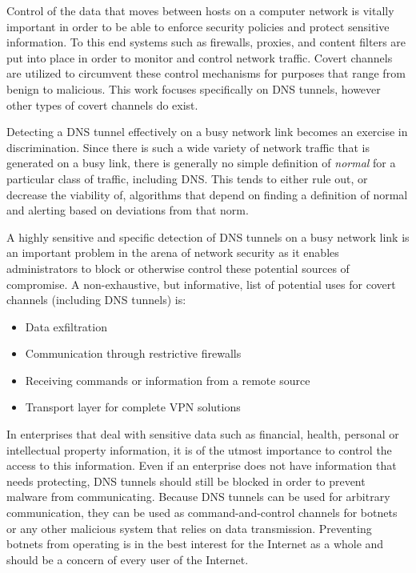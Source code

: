 \documentclass[12pt]{report}
\theoremstyle{remark}
\theoremstyle{definition}
\theoremstyle{definition}
\theoremstyle{definition}
\begin{document}
Control of the data that moves between hosts on a computer network is vitally
important in order to be able to enforce security policies and protect sensitive
information. To this end systems such as firewalls, proxies, and content filters
are put into place in order to monitor and control network traffic. Covert
channels are utilized to circumvent these control mechanisms for purposes that
range from benign to malicious. This work focuses specifically on DNS tunnels,
however other types of covert channels do exist.

Detecting a DNS tunnel effectively on a busy network link becomes an exercise in
discrimination. Since there is such a wide variety of network traffic that is
generated on a busy link, there is generally no simple definition of
\emph{normal} for a particular class of traffic, including DNS. This tends to
either rule out, or decrease the viability of, algorithms that depend on finding
a definition of normal and alerting based on deviations from that norm.

A highly sensitive and specific detection of DNS tunnels on a busy network link
is an important problem in the arena of network security as it enables
administrators to block or otherwise control these potential sources of
compromise. A non-exhaustive, but informative, list of potential uses for covert
channels (including DNS tunnels) is:

\begin{itemize} \item Data exfiltration \item Communication through restrictive
firewalls \item Receiving commands or information from a remote source \item
Transport layer for complete VPN solutions \end{itemize}

In enterprises that deal with sensitive data such as financial, health,
personal or intellectual property information, it is of the utmost importance to
control the access to this information. Even if an enterprise does not have
information that needs protecting, DNS tunnels should still be blocked in order
to prevent malware from communicating\cite{Dietrich2011}. Because DNS tunnels can be used for
arbitrary communication, they can be used as command-and-control channels for
botnets\cite{WoframlAlpha-Botnet} or any other malicious system that relies on data transmission.
Preventing botnets from operating is in the best interest for the Internet as a
whole and should be a concern of every user of the Internet.
\end{document}
